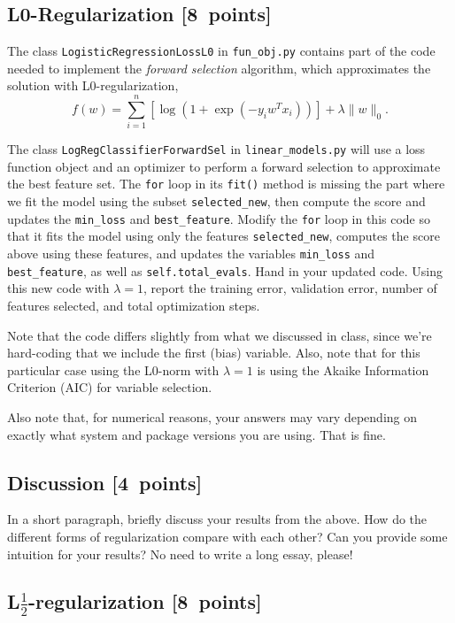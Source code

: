 \documentclass{article}
\newcommand{\blu}[1]{{\textcolor{blu}{#1}}}
\let\ask\blu
\newcommand\pts[1]{\textcolor{pointscolour}{[#1~points]}}
\newcommand{\norm}[1]{\lVert #1 \rVert}
\begin{document}
\subsection{L0-Regularization \pts{8}}

The class \verb|LogisticRegressionLossL0| in \verb|fun_obj.py| contains part of the code needed to implement the \emph{forward selection} algorithm,
which approximates the solution with L0-regularization,
\[
f(w) =  \sum_{i=1}^n \left[\log(1+\exp(-y_iw^Tx_i))\right] + \lambda\norm{w}_0.
\]

The class \verb|LogRegClassifierForwardSel| in \verb|linear_models.py| will use a loss function object and an optimizer to perform a forward selection to approximate the best feature set.
The \verb|for| loop in its \verb|fit()| method is missing the part where we fit the model using the subset \verb|selected_new|,
then compute the score and updates the \verb|min_loss| and \verb|best_feature|.
Modify the \verb|for| loop in this code so that it fits the model using only
the features \verb|selected_new|, computes the score above using these features,
and updates the variables \verb|min_loss| and \verb|best_feature|,
as well as \verb|self.total_evals|.
\ask{Hand in your updated code. Using this new code with $\lambda=1$,
report the training error, validation error, number of features selected, and total optimization steps.}

Note that the code differs slightly from what we discussed in class,
since we're hard-coding that we include the first (bias) variable.
Also, note that for this particular case using the L0-norm with $\lambda=1$
is using the Akaike Information Criterion (AIC) for variable selection.

Also note that, for numerical reasons, your answers may vary depending on exactly what system and package versions you are using. That is fine.


\subsection{Discussion \pts{4}}

In a short paragraph, briefly discuss your results from the above. How do the
different forms of regularization compare with each other?
Can you provide some intuition for your results? No need to write a long essay, please!



\subsection{L$\frac12$-regularization \pts{8}}
\end{document}
